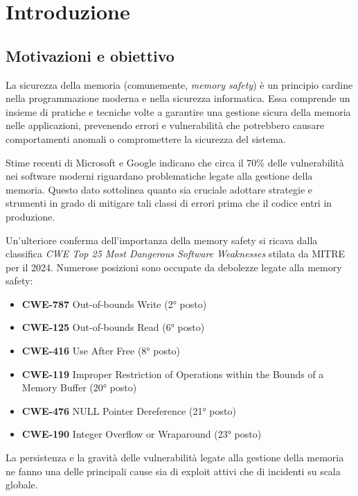 \chapter{Introduzione}
\label{cha:introduction_new}

\section{Motivazioni e obiettivo}
La sicurezza della memoria (comunemente, \textit{memory safety}) è un principio
cardine nella programmazione moderna e nella sicurezza informatica. Essa comprende
un insieme di pratiche e tecniche volte a garantire una gestione sicura della memoria
nelle applicazioni, prevenendo errori e vulnerabilità che potrebbero causare
comportamenti anomali o compromettere la sicurezza del sistema.

Stime recenti di Microsoft\cite{microsoft_proactive_approach} e Google\cite{chromium_memory_safety}
indicano che circa il 70\% delle vulnerabilità nei software moderni riguardano problematiche
legate alla gestione della memoria. Questo dato sottolinea quanto sia cruciale
adottare strategie e strumenti in grado di mitigare tali classi di errori prima
che il codice entri in produzione.

Un'ulteriore conferma dell'importanza della memory safety si ricava dalla
classifica \textit{CWE Top 25 Most Dangerous Software Weaknesses}\cite{cwe_top25_2024}
stilata da MITRE per il 2024. Numerose posizioni sono occupate da debolezze
legate alla memory safety:
\begin{itemize}
  \item \textbf{CWE-787} Out-of-bounds Write (2° posto)

  \item \textbf{CWE-125} Out-of-bounds Read (6° posto)

  \item \textbf{CWE-416} Use After Free (8° posto)

  \item \textbf{CWE-119} Improper Restriction of Operations within the Bounds of
    a Memory Buffer (20° posto)

  \item \textbf{CWE-476} NULL Pointer Dereference (21° posto)

  \item \textbf{CWE-190} Integer Overflow or Wraparound (23° posto)
\end{itemize}
La persistenza e la gravità delle vulnerabilità legate alla gestione della memoria
ne fanno una delle principali cause sia di exploit attivi che di incidenti su scala
globale.

